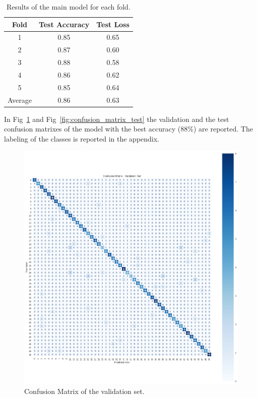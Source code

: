 \documentclass{article}
\begin{document}
\begin{sloppy}
\begin{table}[ht]
  \centering
  \caption{Results of the main model for each fold.}
  \label{tab:folds_results}
  \begin{tabular}{|c|c|c|}
    \hline
    Fold & Test Accuracy & Test Loss \\
    \hline
    1 & 0.85 & 0.65 \\
    2 & 0.87 & 0.60 \\
    3 & 0.88 & 0.58 \\
    4 & 0.86 & 0.62 \\
    5 & 0.85 & 0.64 \\
    \hline
    Average & 0.86 & 0.63 \\
    \hline
  \end{tabular}
\end{table}

In Fig~\ref{fig:confusion_matrix_val} and Fig~\ref{fig:confusion_matrix_test} the
validation and the test confusion matrixes of the model with the best accuracy (88\%) are reported. The
labeling of the classes is reported in the appendix.

\begin{figure}[ht]
  \centering
  \centerline{\includegraphics[width=\columnwidth]{Confusion_matrix_val.png}}
  \caption{Confusion Matrix of the validation set.}
  \label{fig:confusion_matrix_val}
\end{figure}


\end{sloppy}
\end{document}

